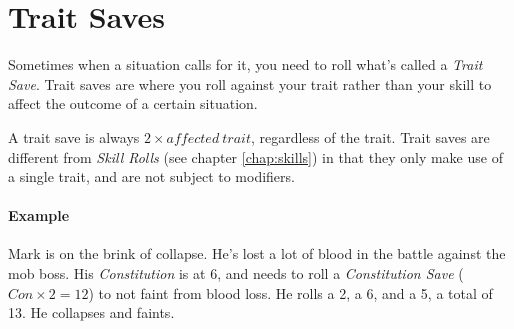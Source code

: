 \section{Trait Saves}
Sometimes when a situation calls for it, you need to roll what's called a \textit{Trait Save}.
Trait saves are where you roll against your trait rather than your skill to affect the outcome of a certain situation.

A trait save is always $2 \times \mathit{affected\ trait}$, regardless of the trait.
Trait saves are different from \textit{Skill Rolls} (see chapter \ref{chap:skills}) in that they only make use of a single trait, and are not subject to modifiers.

\paragraph{Example} Mark is on the brink of collapse.
He's lost a lot of blood in the battle against the mob boss.
His \textit{Constitution} is at 6, and needs to roll a \textit{Constitution Save} ($Con \times 2 = 12$) to not faint from blood loss.
He rolls a 2, a 6, and a 5, a total of 13. He collapses and faints.

